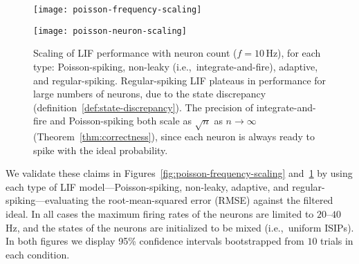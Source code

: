 \begin{figure}
\centering
\texttt{[image: poisson-frequency-scaling]}
\caption[Spiking neuron performance with input frequency.]{\label{fig:poisson-frequency-scaling} Scaling of LIF performance with frequency, for each type: Poisson-spiking, non-leaky (i.e.,~integrate-and-fire), adaptive, and regular-spiking.
The input is a sinusoid with frequency $f$\,Hz.
Due to the memoryless property of the Poisson process, and the uniformity of ReLU, both outperform LIF with constant precision as $f \rightarrow \infty$ (Theorem~\ref{thm:correctness}), assuming $n$ and $\tau$ are scaled appropriately with frequency (see text for details).
}

\vspace{1em}

\texttt{[image: poisson-neuron-scaling]}
\caption[Spiking neuron performance with neuron count.]{\label{fig:poisson-neuron-scaling} Scaling of LIF performance with neuron count ($f = 10$\,Hz), for each type: Poisson-spiking, non-leaky (i.e.,~integrate-and-fire), adaptive, and regular-spiking.
Regular-spiking LIF plateaus in performance for large numbers of neurons, due to the state discrepancy (definition~\ref{def:state-discrepancy}).
The precision of integrate-and-fire and Poisson-spiking both scale as ${\sqrt{n}}$ as $n \rightarrow \infty$ (Theorem~\ref{thm:correctness}), since each neuron is always ready to spike with the ideal probability. 
}
\end{figure}

We validate these claims in Figures~\ref{fig:poisson-frequency-scaling} and~\ref{fig:poisson-neuron-scaling} by using each type of LIF model---Poisson-spiking, non-leaky, adaptive, and regular-spiking---evaluating the root-mean-squared error (RMSE) against the filtered ideal.
In all cases the maximum firing rates of the neurons are limited to $20$--$40$\,Hz, and the states of the neurons are initialized to be mixed (i.e.,~uniform ISIPs).
In both figures we display 95\% confidence intervals bootstrapped from $10$ trials in each condition.

